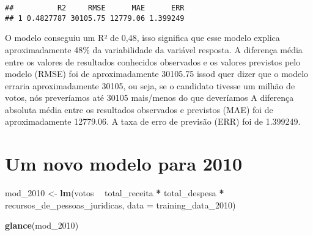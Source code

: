 \documentclass[]{article}
\newenvironment{Shaded}{\begin{snugshade}}{\end{snugshade}}
\newcommand{\KeywordTok}[1]{\textcolor[rgb]{0.13,0.29,0.53}{\textbf{#1}}}
\newcommand{\DataTypeTok}[1]{\textcolor[rgb]{0.13,0.29,0.53}{#1}}
\newcommand{\DecValTok}[1]{\textcolor[rgb]{0.00,0.00,0.81}{#1}}
\newcommand{\StringTok}[1]{\textcolor[rgb]{0.31,0.60,0.02}{#1}}
\newcommand{\OperatorTok}[1]{\textcolor[rgb]{0.81,0.36,0.00}{\textbf{#1}}}
\newcommand{\NormalTok}[1]{#1}
\begin{document}
\begin{Shaded}
\end{Shaded}

\begin{verbatim}
##          R2     RMSE      MAE      ERR
## 1 0.4827787 30105.75 12779.06 1.399249
\end{verbatim}

O modelo conseguiu um R² de 0,48, isso significa que esse modelo explica
aproximadamente 48\% da variabilidade da variável resposta. A diferença
média entre os valores de resultados conhecidos observados e os valores
previstos pelo modelo (RMSE) foi de aproximadamente 30105.75 issod quer
dizer que o modelo erraria aproximadamente 30105, ou seja, se o
candidato tivesse um milhão de votos, nós preveríamos até 30105
mais/menos do que deveríamos A diferença absoluta média entre os
resultados observados e previstos (MAE) foi de aproximadamente 12779.06.
A taxa de erro de previsão (ERR) foi de 1.399249.

\section{Um novo modelo para 2010}\label{um-novo-modelo-para-2010}

\begin{Shaded}
\begin{Highlighting}[]
\NormalTok{mod_}\DecValTok{2010}\NormalTok{ <-}\StringTok{ }\KeywordTok{lm}\NormalTok{(votos }\OperatorTok{~}\StringTok{ }\NormalTok{total_receita }\OperatorTok{*}\StringTok{ }\NormalTok{total_despesa }\OperatorTok{*}\StringTok{ }\NormalTok{recursos_de_pessoas_juridicas,}
          \DataTypeTok{data =}\NormalTok{ training_data_}\DecValTok{2010}\NormalTok{)}

\KeywordTok{glance}\NormalTok{(mod_}\DecValTok{2010}\NormalTok{)}
\end{Highlighting}
\end{Shaded}
\end{document}
